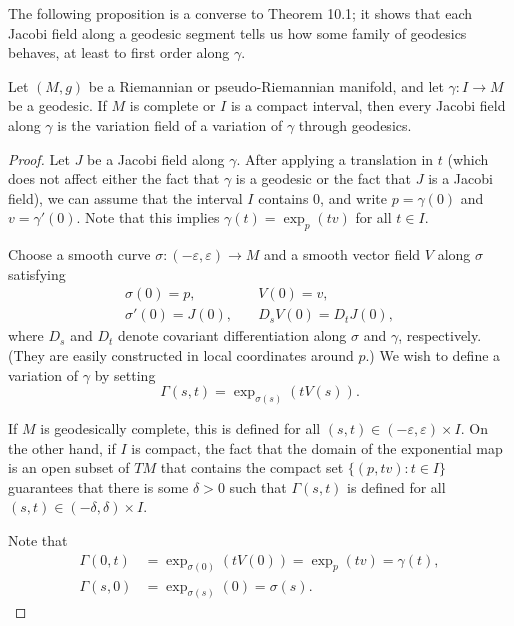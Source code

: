 The following proposition is a converse to Theorem 10.1; it shows that each Jacobi field along a geodesic segment tells us how some family of geodesics behaves, at least to first order along $\gamma$.

\begin{proposition}
\label{prop:jacobi-field-variation-field}

Let $(M,g)$ be a Riemannian or pseudo-Riemannian manifold, and let $\gamma : I \to M$ be a geodesic. If $M$ is complete or $I$ is a compact interval, then every Jacobi field along $\gamma$ is the variation field of a variation of $\gamma$ through geodesics.
\end{proposition}

\begin{proof}
Let $J$ be a Jacobi field along $\gamma$. After applying a translation in $t$ (which does not affect either the fact that $\gamma$ is a geodesic or the fact that $J$ is a Jacobi field), we can assume that the interval $I$ contains $0$, and write $p = \gamma(0)$ and $v = \gamma'(0)$. Note that this implies $\gamma(t) = \exp_p(tv)$ for all $t \in I$.

Choose a smooth curve $\sigma : (-\varepsilon,\varepsilon) \to M$ and a smooth vector field $V$ along $\sigma$ satisfying
\[
\begin{aligned}
\sigma(0) = p, \quad & V(0) = v, \\
\sigma'(0) = J(0), \quad & D_s V(0) = D_t J(0),
\end{aligned}
\]
where $D_s$ and $D_t$ denote covariant differentiation along $\sigma$ and $\gamma$, respectively. (They are easily constructed in local coordinates around $p$.) We wish to define a variation of $\gamma$ by setting
\begin{equation}
\Gamma(s,t) = \exp_{\sigma(s)}(tV(s)). \tag{10.2}
\end{equation}

If $M$ is geodesically complete, this is defined for all $(s,t) \in (-\varepsilon,\varepsilon) \times I$. On the other hand, if $I$ is compact, the fact that the domain of the exponential map is an open subset of $TM$ that contains the compact set $\{(p,tv) : t \in I\}$ guarantees that there is some $\delta > 0$ such that $\Gamma(s,t)$ is defined for all $(s,t) \in (-\delta,\delta) \times I$.

Note that
\begin{align}
\Gamma(0,t) &= \exp_{\sigma(0)}(tV(0)) = \exp_p(tv) = \gamma(t), \tag{10.3} \\
\Gamma(s,0) &= \exp_{\sigma(s)}(0) = \sigma(s). \tag{10.4}
\end{align}


\end{proof}
